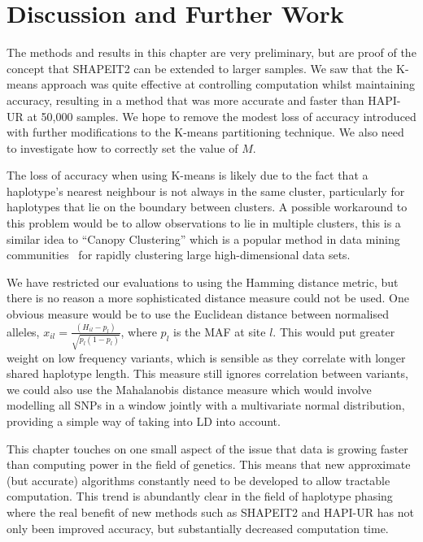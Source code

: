 \section{Discussion and Further Work}

The methods and results in this chapter are very preliminary, but are proof of the concept that SHAPEIT2 can be extended to larger samples. We saw that the K-means approach was quite effective at controlling computation whilst maintaining accuracy, resulting in a method that was more accurate and faster than HAPI-UR at 50,000 samples.  We hope to remove the modest loss of accuracy introduced with further modifications to the K-means partitioning technique. We also need to investigate how to correctly set the value of $M$.

The loss of accuracy when using K-means is likely due to the fact that a haplotype's nearest neighbour is not always in the same cluster, particularly for haplotypes that lie on the boundary between clusters.  A possible workaround to this problem would be to  allow observations to lie in multiple clusters, this is a similar idea to ``Canopy Clustering'' which is a popular method in data mining communities~\citep{mccallum2000efficient} for rapidly clustering large high-dimensional data sets. 

We have restricted our evaluations to using the Hamming distance metric, but there is no reason a more sophisticated distance measure could not be used.  One obvious measure would be to use the Euclidean distance between normalised alleles, $x_{il} = \frac{(H_{il} - p_l)}{\sqrt{p_l(1-p_l)}}$, where $p_l$ is the MAF at site $l$.  This would put greater weight on low frequency variants, which is sensible as they correlate with longer shared haplotype length.  This measure still ignores correlation between variants, we could also use the Mahalanobis distance measure which would involve modelling all SNPs in a window jointly with a multivariate normal distribution, providing a simple way of taking into LD into account.

This chapter touches on one small aspect of the issue that data is growing faster than computing power in the field of genetics.  This means that new approximate (but accurate) algorithms constantly need to be developed to allow tractable computation. This trend is abundantly clear in the field of haplotype phasing where the real benefit of new methods such as SHAPEIT2 and HAPI-UR has not only been improved accuracy, but substantially decreased computation time.
